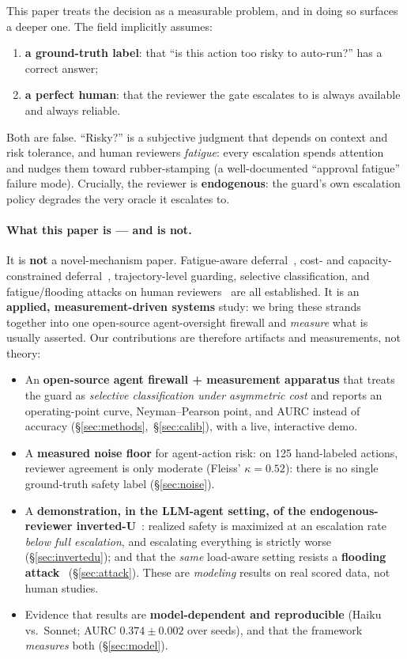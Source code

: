 \documentclass[11pt]{article}
\begin{document}
This paper treats the decision as a measurable problem, and in doing so surfaces a deeper one. The
field implicitly assumes:
\begin{enumerate}
  \item \textbf{a ground-truth label}: that ``is this action too risky to auto-run?'' has a
  correct answer;
  \item \textbf{a perfect human}: that the reviewer the gate escalates to is always available and
  always reliable.
\end{enumerate}

Both are false. ``Risky?'' is a subjective judgment that depends on context and risk tolerance, and
human reviewers \emph{fatigue}: every escalation spends attention and nudges them toward
rubber-stamping (a well-documented ``approval fatigue'' failure mode). Crucially, the reviewer is
\textbf{endogenous}: the guard's own escalation policy degrades the very oracle it escalates to.

\paragraph{What this paper is --- and is not.} It is \textbf{not} a novel-mechanism paper.
Fatigue-aware deferral~\cite{falcon}, cost- and capacity-constrained deferral~\cite{deccaf},
trajectory-level guarding, selective classification, and
fatigue/flooding attacks on human reviewers~\cite{tariq25} are all established. It is an
\textbf{applied, measurement-driven systems} study: we bring these strands together into one
open-source agent-oversight firewall and \emph{measure} what is usually asserted. Our contributions
are therefore artifacts and measurements, not theory:
\begin{itemize}
  \item An \textbf{open-source agent firewall + measurement apparatus} that treats the guard as
  \emph{selective classification under asymmetric cost} and reports an operating-point curve,
  Neyman--Pearson point, and AURC instead of accuracy (\S\ref{sec:methods},~\S\ref{sec:calib}), with
  a live, interactive demo.
  \item A \textbf{measured noise floor} for agent-action risk: on 125 hand-labeled actions, reviewer
  agreement is only moderate (Fleiss' $\kappa = 0.52$): there is no single ground-truth safety
  label (\S\ref{sec:noise}).
  \item A \textbf{demonstration, in the LLM-agent setting, of the endogenous-reviewer
  inverted-U}~\cite{falcon}: realized safety is maximized at an escalation rate \emph{below full
  escalation}, and escalating everything is strictly worse (\S\ref{sec:invertedu}); and that the
  \emph{same} load-aware setting resists a \textbf{flooding attack}~\cite{tariq25}
  (\S\ref{sec:attack}). These are \emph{modeling} results on real scored data, not human studies.
  \item Evidence that results are \textbf{model-dependent and reproducible} (Haiku vs.\ Sonnet; AURC
  $0.374 \pm 0.002$ over seeds), and that the framework \emph{measures} both (\S\ref{sec:model}).
\end{itemize}
\end{document}
